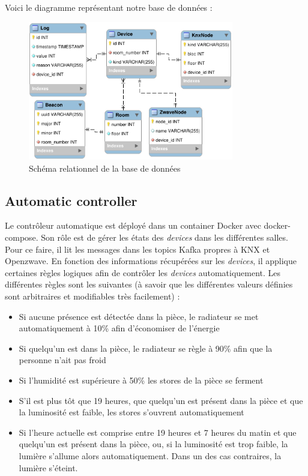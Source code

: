 Voici le diagramme représentant notre base de données :
\begin{figure}
    \begin{center}
        \includegraphics[width=0.8\textwidth]{img/mysql-shema.png}
    \end{center}
    \caption{Schéma relationnel de la base de données}
    \label{db_schema}
\end{figure}

\subsection{Automatic controller}
Le contrôleur automatique est déployé dans un container Docker avec docker-compose. Son rôle est de gérer les états des \textit{devices} dans les différentes salles. Pour ce faire, il lit les messages dans les topics Kafka propres à KNX et Openzwave. En fonction des informations récupérées sur les \textit{devices}, il applique certaines règles logiques afin de contrôler les \textit{devices} automatiquement.
Les différentes règles sont les suivantes (à savoir que les différentes valeurs définies sont arbitraires et modifiables très facilement) :
\begin{itemize}
  \item Si aucune présence est détectée dans la pièce, le radiateur se met automatiquement à 10\% afin d'économiser de l'énergie
  \item Si quelqu'un est dans la pièce, le radiateur se règle à 90\% afin que la personne n'ait pas froid
  \item Si l'humidité est supérieure à 50\% les stores de la pièce se ferment
  \item S'il est plus tôt que 19 heures, que quelqu'un est présent dans la pièce et que la luminosité est faible, les stores s'ouvrent automatiquement
  \item Si l'heure actuelle est comprise entre 19 heures et 7 heures du matin et que quelqu'un est présent dans la pièce, ou, si la luminosité est trop faible, la lumière s'allume alors automatiquement. Dans un des cas contraires, la lumière s'éteint.
\end{itemize}

